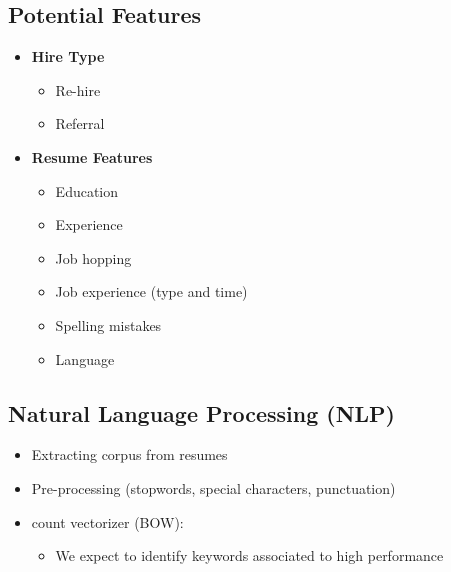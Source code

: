 \documentclass[
]{article}
\providecommand{\tightlist}{%
  \setlength{\itemsep}{0pt}\setlength{\parskip}{0pt}}
\begin{document}
\hypertarget{potential-features}{%
\subsection{Potential Features}\label{potential-features}}

\begin{itemize}
\tightlist
\item
  \textbf{Hire Type}

  \begin{itemize}
  \tightlist
  \item
    Re-hire
  \item
    Referral
  \end{itemize}
\end{itemize}

\begin{itemize}
\tightlist
\item
  \textbf{Resume Features}

  \begin{itemize}
  \tightlist
  \item
    Education
  \item
    Experience
  \item
    Job hopping
  \item
    Job experience (type and time)
  \item
    Spelling mistakes
  \item
    Language
  \end{itemize}
\end{itemize}

\hypertarget{natural-language-processing-nlp}{%
\subsection{Natural Language Processing
(NLP)}\label{natural-language-processing-nlp}}

\begin{itemize}
\tightlist
\item
  Extracting corpus from resumes
\item
  Pre-processing (stopwords, special characters, punctuation)
\end{itemize}

\begin{itemize}
\tightlist
\item
  count vectorizer (BOW):

  \begin{itemize}
  \tightlist
  \item
    We expect to identify keywords associated to high performance
  \end{itemize}
\end{itemize}
\end{document}
